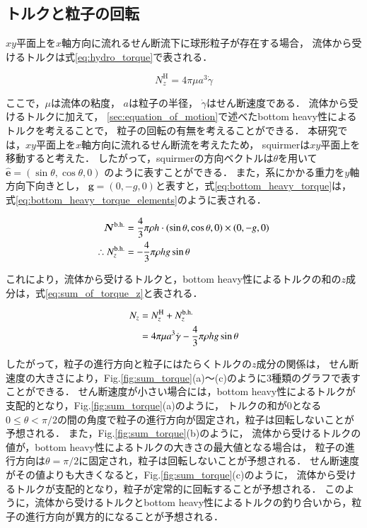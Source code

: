 \subsection{トルクと粒子の回転}
\label{sec:rotation}
$xy$平面上を$x$軸方向に流れるせん断流下に球形粒子が存在する場合，
流体から受けるトルクは式\eqref{eq:hydro_torque}で表される\cite{hidro_torque}．

    \begin{equation}
        N^\mathrm{H}_z = 4 \pi \mu a^3 \dot{\gamma}
        \label{eq:hydro_torque}
    \end{equation}

\noindent
ここで，$\mu$は流体の粘度，
$a$は粒子の半径，
$\dot{\gamma}$はせん断速度である．
流体から受けるトルクに加えて，
\ref{sec:equation_of_motion}で述べたbottom heavy性によるトルクを考えることで，
粒子の回転の有無を考えることができる．
本研究では，$xy$平面上を$x$軸方向に流れるせん断流を考えたため，
squirmerは$xy$平面上を移動すると考えた．
したがって，squirmerの方向ベクトルは$\theta$を用いて
$\boldsymbol{\hat{e}} = (\sin{\theta}, \cos{\theta}, 0)$
のように表すことができる．
また，系にかかる重力を$y$軸方向下向きとし，
$\boldsymbol{g} = (0, -g, 0)$と表すと，式\eqref{eq:bottom_heavy_torque}は，
式\eqref{eq:bottom_heavy_torque_elements}のように表される．

    \begin{align}
        \boldsymbol{N}^\mathrm{b.h.} &= \frac{4}{3} \pi \rho h \cdot (\sin{\theta}, \cos{\theta}, 0) \times (0, -g, 0) \notag \\
        \therefore N^\mathrm{b.h.}_z &= - \frac{4}{3} \pi \rho h g \sin{\theta}
        \label{eq:bottom_heavy_torque_elements}
    \end{align}

\noindent
これにより，流体から受けるトルクと，bottom heavy性によるトルクの和の$z$成分は，式\eqref{eq:sum_of_torque_z}と表される．

    \begin{align}
        N_z &= N^\mathrm{H}_z + N^\mathrm{b.h.}_z \notag \\
            &= 4 \pi \mu a^3 \dot{\gamma} - \frac{4}{3} \pi \rho h g \sin{\theta}
        \label{eq:sum_of_torque_z}
    \end{align}

\noindent
したがって，粒子の進行方向と粒子にはたらくトルクの$z$成分の関係は，
せん断速度の大きさにより，Fig.\ref{fig:sum_torque}(a)〜(c)のように3種類のグラフで表すことができる．
せん断速度が小さい場合には，bottom heavy性によるトルクが支配的となり，Fig.\ref{fig:sum_torque}(a)のように，
トルクの和が0となる$0 \leq \theta < \pi / 2$の間の角度で粒子の進行方向が固定され，粒子は回転しないことが予想される．
また，Fig.\ref{fig:sum_torque}(b)のように，
流体から受けるトルクの値が，bottom heavy性によるトルクの大きさの最大値となる場合は，
粒子の進行方向は$\theta = \pi / 2$に固定され，粒子は回転しないことが予想される．
せん断速度がその値よりも大きくなると，Fig.\ref{fig:sum_torque}(c)のように，
流体から受けるトルクが支配的となり，粒子が定常的に回転することが予想される．
このように，流体から受けるトルクとbottom heavy性によるトルクの釣り合いから，粒子の進行方向が異方的になることが予想される．

